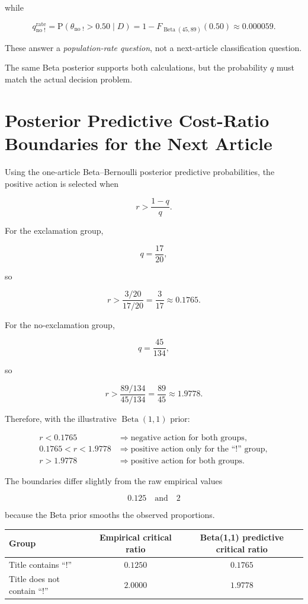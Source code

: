 \documentclass[11pt]{article}
\newcommand{\Prob}{\mathrm{P}}
\begin{document}
while

\[
q_{\text{no }!}^{\mathrm{rate}}
=
\Prob(\theta_{\text{no }!}>0.50\mid D)
=
1-F_{\operatorname{Beta}(45,89)}(0.50)
\approx
0.000059.
\]

These answer a \emph{population-rate question}, not a next-article classification question.

The same Beta posterior supports both calculations, but the probability $q$ must match the actual decision problem.

\section{Posterior Predictive Cost-Ratio Boundaries for the Next Article}

Using the one-article Beta--Bernoulli posterior predictive probabilities, the positive action is selected when

\[
r>\frac{1-q}{q}.
\]

For the exclamation group,

\[
q=\frac{17}{20},
\]

so

\[
r
>
\frac{3/20}{17/20}
=
\frac{3}{17}
\approx
0.1765.
\]

For the no-exclamation group,

\[
q=\frac{45}{134},
\]

so

\[
r
>
\frac{89/134}{45/134}
=
\frac{89}{45}
\approx
1.9778.
\]

Therefore, with the illustrative $\operatorname{Beta}(1,1)$ prior:

\[
\boxed{
\begin{array}{ll}
r<0.1765
&
\Rightarrow
\text{negative action for both groups},
\\[6pt]
0.1765<r<1.9778
&
\Rightarrow
\text{positive action only for the ``!'' group},
\\[6pt]
r>1.9778
&
\Rightarrow
\text{positive action for both groups}.
\end{array}
}
\]

The boundaries differ slightly from the raw empirical values

\[
0.125
\quad\text{and}\quad
2
\]

because the Beta prior smooths the observed proportions.

\begin{center}
\begin{tabular}{lcc}
\toprule
Group & Empirical critical ratio & Beta(1,1) predictive critical ratio \\
\midrule
Title contains ``!'' & $0.1250$ & $0.1765$ \\
Title does not contain ``!'' & $2.0000$ & $1.9778$ \\
\bottomrule
\end{tabular}
\end{center}
\end{document}
